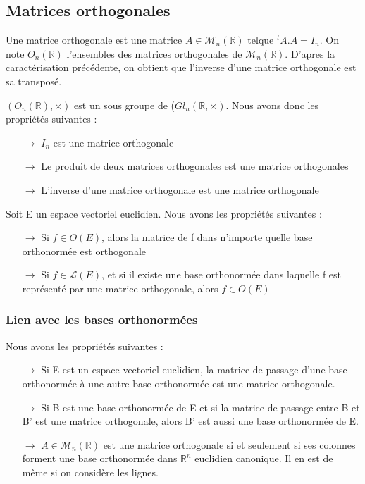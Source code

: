 \subsection{Matrices orthogonales}
\begin{de}
Une matrice orthogonale est une matrice $A \in \mathcal{M}_n(\mathbb{R})$ telque $^tA.A = I_n$. On note $O_n(\mathbb{R})$ l'ensembles des matrices orthogonales de $\mathcal{M}_n(\mathbb{R})$. D'apres la caractérisation précédente, on obtient que l'inverse d'une matrice orthogonale est sa transposé.
\end{de}
\begin{prop}
$(O_n(\mathbb{R}),\times)$ est un sous groupe de ($Gl_n(\mathbb{R},\times)$. Nous avons donc les propriétés suivantes : 
\begin{itemize}
 \item[$\rightarrow$] $I_n$ est une matrice orthogonale
 \item[$\rightarrow$] Le produit de deux matrices orthogonales est une matrice orthogonales
 \item[$\rightarrow$] L'inverse d'une matrice orthogonale est une matrice orthogonale
\end{itemize}
\end{prop}
\begin{prop}
Soit E un espace vectoriel euclidien. Nous avons les propriétés suivantes : 
\begin{itemize}
 \item[$\rightarrow$] Si $f \in O(E)$, alors la matrice de f dans n'importe quelle base orthonormée est orthogonale
 \item[$\rightarrow$] Si $f \in \mathcal{L}(E)$, et si il existe une base orthonormée dans laquelle f est représenté par une matrice orthogonale, alors $f \in O(E)$
\end{itemize}
\end{prop}
\subsubsection{Lien avec les bases orthonormées}
\begin{prop}
Nous avons les propriétés suivantes :
\begin{itemize}
 \item[$\rightarrow$] Si E est un espace vectoriel euclidien, la matrice de passage d'une base orthonormée à une autre base orthonormée est une matrice orthogonale.
 \item[$\rightarrow$] Si B est une base orthonormée de E et si la matrice de passage entre B et B' est une matrice orthogonale, alors B' est aussi une base orthonormée de E.
 \item[$\rightarrow$] $A \in \mathcal{M}_n(\mathbb{R})$ est une matrice orthogonale si et seulement si ses colonnes forment une base orthonormée dans $\mathbb{R}^n$ euclidien canonique. Il en est de même si on considère les lignes.
\end{itemize}
\end{prop}
